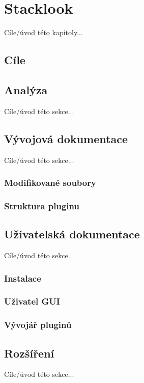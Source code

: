 \chapter{Stacklook}
Cíle/úvod této kapitoly...

\section{Cíle}

\section{Analýza}
Cíle/úvod této sekce...


\section{Vývojová dokumentace}
Cíle/úvod této sekce...

\subsection{Modifikované soubory}

\subsection{Struktura pluginu}

\section{Uživatelská dokumentace}
Cíle/úvod této sekce...

\subsection{Instalace}

\subsection{Uživatel GUI}

\subsection{Vývojář pluginů}

\section{Rozšíření}
Cíle/úvod této sekce...